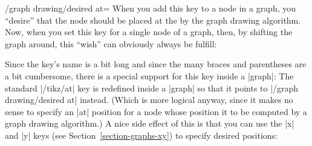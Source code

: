 \begin{key}{/graph drawing/desired at=}
  When you add this key to a node in a graph, you ``desire'' that the
  node should be placed at the  by the graph drawing
  algorithm. Now, when you set this key for a single node of a graph,
  then, by shifting the graph around, this ``wish'' can obviously
  always be fulfill:
\begin{codeexample}[]
\end{codeexample}
\begin{codeexample}[]
\end{codeexample}
  Since the key's name is a bit long and since the many braces and
  parentheses are a bit cumbersome, there is a special support for
  this key inside a |graph|: The standard |/tikz/at| key is redefined
  inside a |graph| so that it points to |/graph drawing/desired at|
  instead. (Which is more logical anyway, since it makes no sense to
  specify an |at| position for a node whose position it to be computed
  by a graph drawing algorithm.) A nice side effect of this is that
  you can use the |x| and |y| keys (see
  Section~\ref{section-graphs-xy}) to specify desired positions:
\begin{codeexample}[]
\end{codeexample}
\begin{codeexample}[]
\end{codeexample}


\end{key}
